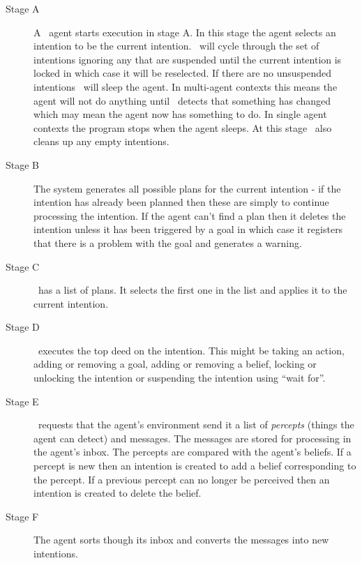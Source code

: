 \begin{description}
\item[Stage A]
A \gwendolen\ agent starts execution in stage A.  In this stage the agent selects an intention to be the current intention.  \gwendolen\ will cycle through the set of intentions ignoring any that are suspended until the current intention is locked in which case it will be reselected.  If there are no unsuspended intentions \gwendolen\ will sleep the agent.  In multi-agent contexts this means the agent will not do anything until \gwendolen\ detects that something has changed which may mean the agent now has something to do.  In single agent contexts the program stops when the agent sleeps.  At this stage \gwendolen\ also cleans up any empty intentions.
\item[Stage B]
The system generates all possible plans for the current intention - if the intention has already been planned then these are simply to continue processing the intention.  If the agent can't find a plan then it deletes the intention unless it has been triggered by a goal in which case it registers that there is a problem with the goal and generates a warning.
\item[Stage C]
\gwendolen\ has a list of plans.  It selects the first one in the list and applies it to the current intention.
\item[Stage D]
\gwendolen\ executes the top deed on the intention.  This might be taking an action, adding or removing a goal, adding or removing a belief, locking or unlocking the intention or suspending the intention using ``wait for''.
\item[Stage E]
\gwendolen\ requests that the agent's environment send it a list of \emph{percepts} (things the agent can detect) and messages.  The messages are stored for processing in the agent's inbox.  The percepts are compared with the agent's beliefs.  If a percept is new then an intention is created to add a belief corresponding to the percept.  If a previous percept can no longer be perceived then an intention is created to delete the belief.
\item[Stage F]
The agent sorts though its inbox and converts the messages into new intentions.
\end{description}

